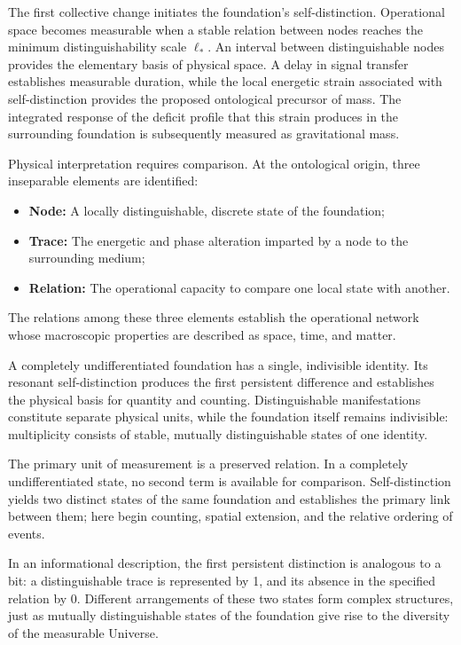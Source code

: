 \documentclass[11pt,a4paper]{article}
\begin{document}
The first collective change initiates the foundation's self-distinction. Operational space becomes measurable when a stable relation between nodes reaches the minimum distinguishability scale $\ell_*$. An interval between distinguishable nodes provides the elementary basis of physical space. A delay in signal transfer establishes measurable duration, while the local energetic strain associated with self-distinction provides the proposed ontological precursor of mass. The integrated response of the deficit profile that this strain produces in the surrounding foundation is subsequently measured as gravitational mass.

Physical interpretation requires comparison. At the ontological origin, three inseparable elements are identified:
\begin{itemize}
\item \textbf{Node:} A locally distinguishable, discrete state of the foundation;
\item \textbf{Trace:} The energetic and phase alteration imparted by a node to the surrounding medium;
\item \textbf{Relation:} The operational capacity to compare one local state with another.
\end{itemize}

The relations among these three elements establish the operational network whose macroscopic properties are described as space, time, and matter.

A completely undifferentiated foundation has a single, indivisible identity. Its resonant self-distinction produces the first persistent difference and establishes the physical basis for quantity and counting. Distinguishable manifestations constitute separate physical units, while the foundation itself remains indivisible: multiplicity consists of stable, mutually distinguishable states of one identity.

The primary unit of measurement is a preserved relation. In a completely undifferentiated state, no second term is available for comparison. Self-distinction yields two distinct states of the same foundation and establishes the primary link between them; here begin counting, spatial extension, and the relative ordering of events.

In an informational description, the first persistent distinction is analogous to a bit: a distinguishable trace is represented by 1, and its absence in the specified relation by 0. Different arrangements of these two states form complex structures, just as mutually distinguishable states of the foundation give rise to the diversity of the measurable Universe.
\end{document}
